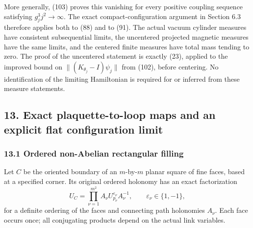 \documentclass[
  11pt,
]{article}
\begin{document}
More generally, (103) proves this vanishing for every positive coupling
sequence satisfying \(g_j^3j^2\to\infty\). The exact
compact-configuration argument in Section 6.3 therefore applies both to
(88) and to (91). The actual vacuum cylinder measures have consistent
subsequential limits, the uncentered projected magnetic measures have
the same limits, and the centered finite measures have total mass
tending to zero. The proof of the uncentered statement is exactly (23),
applied to the improved bound on \(\|(K_{\theta_j}-I)\psi_j\|\) from
(102), before centering. No identification of the limiting Hamiltonian
is required for or inferred from these measure statements.

\subsection{13. Exact plaquette-to-loop maps and an explicit flat
configuration
limit}\label{exact-plaquette-to-loop-maps-and-an-explicit-flat-configuration-limit}

\subsubsection{13.1 Ordered non-Abelian rectangular
filling}\label{ordered-non-abelian-rectangular-filling}

Let \(C\) be the oriented boundary of an \(m\)-by-\(m\) planar square of
fine faces, based at a specified corner. Its original ordered holonomy
has an exact factorization \[
 U_C=\prod_{\nu=1}^{m^2}
       A_\nu U_{p_\nu}^{\varepsilon_\nu}A_\nu^{-1},
 \qquad \varepsilon_\nu\in\{1,-1\},
 \tag{105}
\] for a definite ordering of the faces and connecting path holonomies
\(A_\nu\). Each face occurs once; all conjugating products depend on the
actual link variables.
\end{document}
